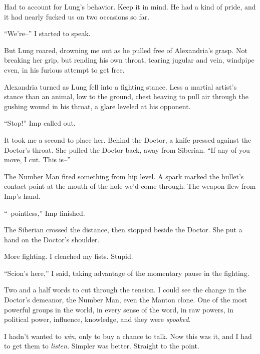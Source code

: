 Had to account for Lung's behavior.  Keep it in mind.  He had a kind of pride, and it had nearly fucked us on two occasions so far.



``We're--'' I started to speak.



But Lung roared, drowning me out as he pulled free of Alexandria's grasp.  Not breaking her grip, but rending his own throat, tearing jugular and vein, windpipe even, in his furious attempt to get free.



Alexandria turned as Lung fell into a fighting stance.  Less a martial artist's stance than an animal, low to the ground, chest heaving to pull air through the gushing wound in his throat, a glare leveled at his opponent.



``Stop!'' Imp called out.



It took me a second to place her.  Behind the Doctor, a knife pressed against the Doctor's throat.  She pulled the Doctor back, away from Siberian.  ``If any of you move, I cut.  This is--''



The Number Man fired something from hip level.  A spark marked the bullet's contact point at the mouth of the hole we'd come through.  The weapon flew from Imp's hand.



``--pointless,'' Imp finished.



The Siberian crossed the distance, then stopped beside the Doctor.  She put a hand on the Doctor's shoulder.



More fighting.  I clenched my fists.  Stupid.



``Scion's here,'' I said, taking advantage of the momentary pause in the fighting.  



Two and a half words to cut through the tension.  I could see the change in the Doctor's demeanor, the Number Man, even the Manton clone.  One of the most powerful groups in the world, in every sense of the word, in raw powers, in political power, influence, knowledge, and they were \emph{spooked}.



I hadn't wanted to \emph{win}, only to buy a chance to talk.  Now this was it, and I had to get them to \emph{listen.}  Simpler was better.  Straight to the point.



